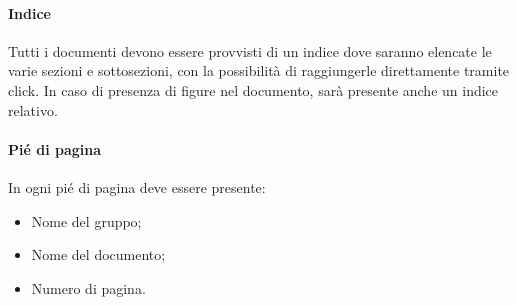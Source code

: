 \paragraph{Indice}
Tutti i documenti devono essere provvisti di un indice dove saranno elencate le varie sezioni e sottosezioni, con la possibilità di raggiungerle direttamente tramite click.
In caso di presenza di figure nel documento, sarà presente anche un indice relativo.

\paragraph{Pié di pagina}
In ogni pié di pagina deve essere presente:
\begin{itemize}
    \item Nome del gruppo;
    \item Nome del documento;
    \item Numero di pagina.
\end{itemize}

